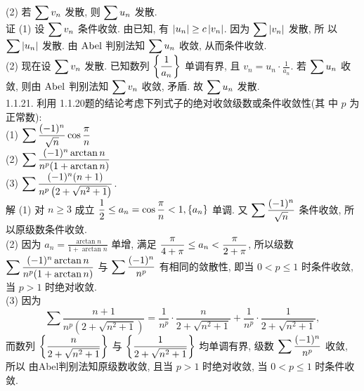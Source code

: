 \documentclass[a4paper,11pt,UTF8]{article}
\begin{document}
(2) 若 $\displaystyle \displaystyle \displaystyle \sum v_n$ 发散, 则 $\displaystyle \displaystyle \displaystyle \sum u_n$ 发散.\\
证 (1) 设 $\displaystyle \displaystyle \displaystyle \sum v_n$ 条件收敛. 由已知, 有 $\displaystyle \displaystyle \displaystyle \left|u_n\right| \geq c\left|v_n\right|$. 因为 $\displaystyle \displaystyle \displaystyle \sum\left|v_n\right|$ 发散, 所 以 $\displaystyle \displaystyle \displaystyle \sum\left|u_n\right|$ 发散. 由 $\displaystyle \displaystyle \displaystyle \mathrm{Abel}$ 判别法知 $\displaystyle \displaystyle \displaystyle \sum u_n$ 收敛, 从而条件收敛.\\
(2) 现在设 $\displaystyle \displaystyle \displaystyle \sum v_n$ 发散. 已知数列 $\displaystyle \displaystyle \displaystyle \left\{\frac{1}{a_n}\right\}$ 单调有界, 且 $v_n=u_n \cdot \frac{1}{a_n}$. 若 $\displaystyle \displaystyle \displaystyle \sum u_n$ 收 敛, 则由 $\displaystyle \displaystyle \displaystyle \mathrm{Abel}$ 判别法知 $\displaystyle \displaystyle \displaystyle \sum v_n$ 收敛, 矛盾. 故 $\displaystyle \displaystyle \displaystyle \sum u_n$ 发散.\\
1.1.21. 利用 1.1.20题的结论考虑下列式子的绝对收敛级数或条件收敛性(其 中 $p$ 为正常数):\\
(1) $\displaystyle \displaystyle \displaystyle \sum \frac{(-1)^n}{\sqrt{n}} \cos \frac{\pi}{n}$\\
(2) $\displaystyle \displaystyle \displaystyle \sum \frac{(-1)^n \arctan n}{n^p(1+\arctan n)}$\\
(3) $\displaystyle \displaystyle \displaystyle \sum \frac{(-1)^n(n+1)}{n^p\left(2+\sqrt{n^2+1}\right)}$.\\
解 (1) 对 $n \geq 3$ 成立 $\displaystyle \displaystyle \displaystyle \frac{1}{2} \leq a_n=\cos \frac{\pi}{n}<1,\left\{a_n\right\}$ 单调. 又 $\displaystyle \displaystyle \displaystyle \sum \frac{(-1)^n}{\sqrt{n}}$ 条件收敛, 所以原级数条件收敛.\\
(2) 因为 $a_n=\frac{\arctan n}{1+\arctan n}$ 单增, 满足 $\displaystyle \displaystyle \displaystyle \frac{\pi}{4+\pi} \leq a_n<\frac{\pi}{2+\pi}$, 所以级数 $\displaystyle \displaystyle \displaystyle \sum \frac{(-1)^n \arctan n}{n^p(1+\arctan n)}$ 与 $\displaystyle \displaystyle \displaystyle \sum \frac{(-1)^n}{n^p}$ 有相同的敛散性, 即当 $0<p \leq 1$ 时条件收敛, 当 $p>1$ 时绝对收敛.\\
(3) 因为
$$
\sum \frac{n+1}{n^p\left(2+\sqrt{n^2+1}\right)}=\frac{1}{n^p} \cdot \frac{n}{2+\sqrt{n^2+1}}+\frac{1}{n^p} \cdot \frac{1}{2+\sqrt{n^2+1}},
$$
而数列 $\displaystyle \displaystyle \displaystyle \left\{\frac{n}{2+\sqrt{n^2+1}}\right\}$ 与 $\displaystyle \displaystyle \displaystyle \left\{\frac{1}{2+\sqrt{n^2+1}}\right\}$ 均单调有界, 级数 $\displaystyle \displaystyle \displaystyle \sum \frac{(-1)^n}{n^p}$ 收敛, 所以 由Abel判别法知原级数收敛, 且当 $p>1$ 时绝对收敛, 当 $0<p \leq 1$ 时条件收敛.\\
\end{document}
